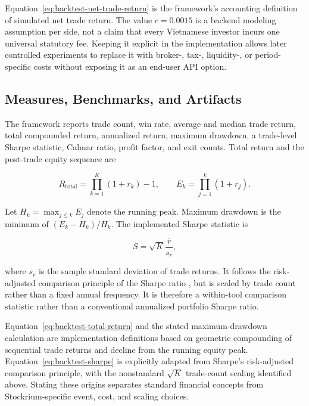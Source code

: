 Equation~\ref{eq:backtest-net-trade-return} is the framework's accounting definition of simulated net trade return. The value $c=0.0015$ is a backend modeling assumption per side, not a claim that every Vietnamese investor incurs one universal statutory fee. Keeping it explicit in the implementation allows later controlled experiments to replace it with broker-, tax-, liquidity-, or period-specific costs without exposing it as an end-user API option.

\subsection{Measures, Benchmarks, and Artifacts}
\label{subsec:backtest-metrics-tests}

The framework reports trade count, win rate, average and median trade return, total compounded return, annualized return, maximum drawdown, a trade-level Sharpe statistic, Calmar ratio, profit factor, and exit counts. Total return and the post-trade equity sequence are

\begin{equation}
    R_{\mathrm{total}}=\prod_{k=1}^{K}(1+r_k)-1,
    \qquad
    E_k=\prod_{j=1}^{k}(1+r_j).
    \label{eq:backtest-total-return}
\end{equation}

Let $H_k=\max_{j\leq k}E_j$ denote the running peak. Maximum drawdown is the minimum of $(E_k-H_k)/H_k$. The implemented Sharpe statistic is

\begin{equation}
    S=\sqrt{K}\frac{\overline{r}}{s_r},
    \label{eq:backtest-sharpe}
\end{equation}

where $s_r$ is the sample standard deviation of trade returns. It follows the risk-adjusted comparison principle of the Sharpe ratio \cite{sharpe1994ratio}, but is scaled by trade count rather than a fixed annual frequency. It is therefore a within-tool comparison statistic rather than a conventional annualized portfolio Sharpe ratio.

Equation~\ref{eq:backtest-total-return} and the stated maximum-drawdown calculation are implementation definitions based on geometric compounding of sequential trade returns and decline from the running equity peak. Equation~\ref{eq:backtest-sharpe} is explicitly adapted from Sharpe's risk-adjusted comparison principle, with the nonstandard $\sqrt{K}$ trade-count scaling identified above. Stating these origins separates standard financial concepts from Stockrium-specific event, cost, and scaling choices.

